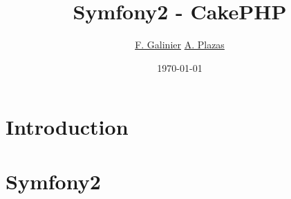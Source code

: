 \usepackage{listings}
\usepackage{hyperref}

\title{\textbf{Symfony2 - CakePHP}}
\author{
  \href{mailto:florian.galinier@etud.univ-montp2.fr}{F. Galinier}
  \href{mailto:adrien.plazas@etud.univ-montp2.fr}{A. Plazas}
}
\date{\today}



\begin{frame}
\titlepage
\end{frame}

\section{Introduction}


\section{Symfony2}



